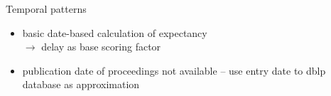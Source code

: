 \documentclass[xcolor={svgnames}]{beamer}
\makeatletter
\newcommand*{\currentname}{\@currentlabelname}
\makeatother
\begin{document}
\begin{frame}{\currentname}\linespread{1.5}
  Temporal patterns
  \begin{itemize}
    \item basic date-based calculation of expectancy\\
    \( \rightarrow \) delay as base scoring factor
    \item publication date of proceedings not available -- use entry date to dblp database as approximation
  \end{itemize}

\end{frame}

%
%
%
%
%
%
%
\end{document}
